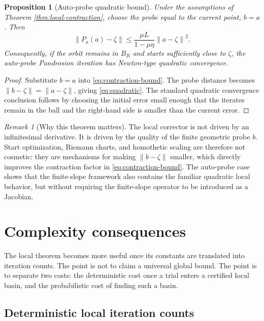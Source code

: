 \documentclass[11pt]{article}
\newtheorem{proposition}[theorem]{Proposition}
\theoremstyle{definition}
\theoremstyle{remark}
\newtheorem{remark}[theorem]{Remark}
\newcommand{\norm}[1]{\left\lVert #1\right\rVert}
\newcommand{\zetaRoot}{\zeta}
\begin{document}
\begin{proposition}[Auto-probe quadratic bound]\label{prop:auto-probe}
Under the assumptions of Theorem \ref{thm:local-contraction}, choose the probe equal to the current point, $b=a$.  Then
\begin{equation}\label{eq:quadratic}
        \norm{P_a(a)-\zetaRoot}
        \leq
        \frac{\mu L}{1-\mu\eta}
        \norm{a-\zetaRoot}^2.
\end{equation}
Consequently, if the orbit remains in $B_R$ and starts sufficiently close to $\zetaRoot$, the auto-probe Pandrosion iteration has Newton-type quadratic convergence.
\end{proposition}

\begin{proof}
Substitute $b=a$ into \eqref{eq:contraction-bound}.  The probe distance becomes $\norm{b-\zetaRoot}=\norm{a-\zetaRoot}$, giving \eqref{eq:quadratic}.  The standard quadratic convergence conclusion follows by choosing the initial error small enough that the iterates remain in the ball and the right-hand side is smaller than the current error.
\end{proof}

\begin{remark}[Why this theorem matters]
The local corrector is not driven by an infinitesimal derivative.  It is driven by the quality of the finite geometric probe $b$.  Start optimization, Riemann charts, and homothetic scaling are therefore not cosmetic: they are mechanisms for making $\norm{b-\zetaRoot}$ smaller, which directly improves the contraction factor in \eqref{eq:contraction-bound}.  The auto-probe case shows that the finite-slope framework also contains the familiar quadratic local behavior, but without requiring the finite-slope operator to be introduced as a Jacobian.
\end{remark}


\section{Complexity consequences}

The local theorem becomes more useful once its constants are translated into iteration counts.  The point is not to claim a universal global bound.  The point is to separate two costs: the deterministic cost once a trial enters a certified local basin, and the probabilistic cost of finding such a basin.

\subsection{Deterministic local iteration counts}
\end{document}
